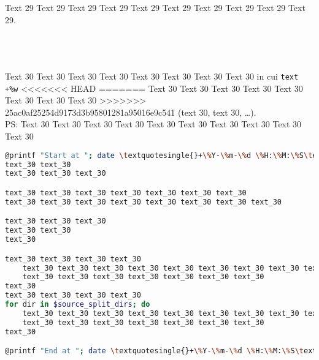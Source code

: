 \documentclass[9pt]{exam}
\begin{document}
\begin{questions}
\question
    Text 29 Text 29 Text 29 Text 29 Text 29 Text 29 Text 29 Text 29 
    Text 29 Text 29.\\\\
    \makebox[0.9\textwidth]{\$ \enspace\hrulefill}\\\\
    \makebox[0.9\textwidth]{\enspace\hrulefill}

\question
    Text 30 Text 30 Text 30 Text 30 Text 30 Text 30 Text 30 Text 30 
    in cui \textquotedbl{}\texttt{text \textquotesingle{}+\%w\textquotesingle{}}\textquotedbl{}
<<<<<<< HEAD
=======
    Text 30 Text 30 Text 30 Text 30 Text 30 Text 30 Text 30 Text 30
>>>>>>> 25ac0af25254d9173d3b95801281a95016e9c541
    (text $30$, text $30$, \dots{}).\\
    PS: Text 30 Text 30 Text 30 Text 30 Text 30
        Text 30 Text 30 Text 30 Text 30 Text 30
\begin{lstlisting}[language=Bash, caption=Text 30 Text 30 Text 30 Text 30 Text 30]
@printf "Start at "; date \textquotesingle{}+\%Y-\%m-\%d \%H:\%M:\%S\textquotesingle{}@
text_30 text_30 
text_30 text_30 text_30

text_30 text_30 text_30 text_30 text_30 text_30 text_30
text_30 text_30 text_30 text_30 text_30 text_30 text_30 text_30

text_30 text_30 text_30
text_30 text_30
text_30

text_30 text_30 text_30 text_30
    text_30 text_30 text_30 text_30 text_30 text_30 text_30 text_30 text_30 text_30
    text_30 text_30 text_30 text_30 text_30 text_30 text_30
text_30
text_30 text_30 text_30 text_30
for dir in $source_split_dirs; do
    text_30 text_30 text_30 text_30 text_30 text_30 text_30 text_30 text_30 text_30
    text_30 text_30 text_30 text_30 text_30 text_30 text_30
text_30

@printf "End at "; date \textquotesingle{}+\%Y-\%m-\%d \%H:\%M:\%S\textquotesingle{}@
\end{lstlisting}
    \makebox[0.9\textwidth]{\$ \enspace\hrulefill}\\\\
    \makebox[0.9\textwidth]{\enspace\hrulefill}\\\\
    \makebox[0.9\textwidth]{\enspace\hrulefill}\\\\
    \makebox[0.9\textwidth]{\enspace\hrulefill}

\end{questions}
\end{document}
